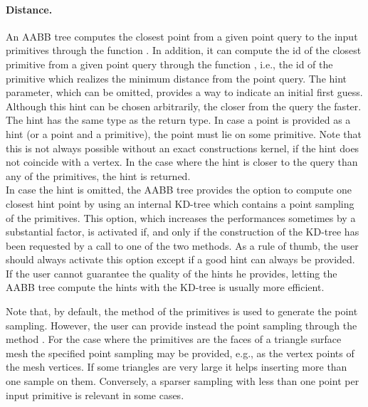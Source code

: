 \paragraph{Distance.} An AABB tree computes the closest point from a given point query to the input primitives through the function . In addition, it can compute the id of the closest primitive from a given point query through the function , i.e., the id of the primitive which realizes the minimum distance from the point query. The hint parameter, which can be omitted, provides a way to indicate an initial first guess. Although this hint can be chosen arbitrarily, the closer from the query the faster. The hint has the same type as the return type. In case a point is provided as a hint (or a point and a primitive), the point must lie on some primitive. Note that this is not always possible without an exact constructions kernel, if the hint does not coincide with a vertex. In the case where the hint is closer to the query than any of the primitives, the hint is returned.\\

In case the hint is omitted, the AABB tree provides the option to compute one closest hint point by using an internal KD-tree which contains a point sampling of the primitives. This option, which increases the performances sometimes by a substantial factor, is activated if, and only if the construction of the KD-tree has been requested by a call to one of the two  methods. As a rule of thumb, the user should always activate this option except if a good hint can always be provided. If the user cannot guarantee the quality of the hints he provides, letting the AABB tree compute the hints with the KD-tree is usually more efficient.

Note that, by default, the method  of the primitives is used to generate the point sampling. However, the user can provide instead the point sampling through the method . For the case where the primitives are the faces of a triangle surface mesh the specified point sampling may be provided, e.g., as the vertex points of the mesh vertices. If some triangles are very large it helps inserting more than one sample on them. Conversely, a sparser sampling with less than one point per input primitive is relevant in some cases. 



